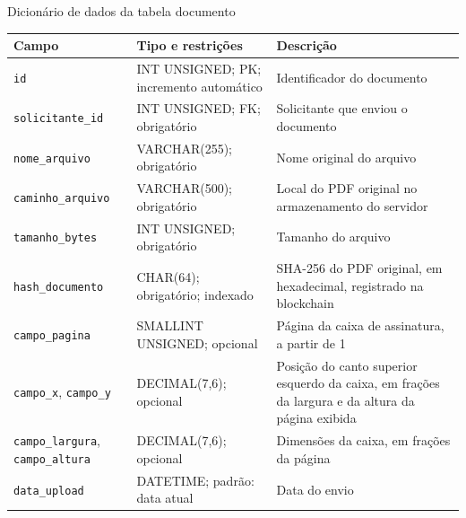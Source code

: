 \documentclass[
    12pt,
    a4paper,
    oneside,
    chapter=TITLE,
    section=TITLE,
    subsection=TITLE,
    subsubsection=TITLE,
    sumario=tradicional,
    english,
    brazil
]{abntex2}
\newcommand{\elem}[1]{\texttt{#1}}
\begin{document}
\begin{quadro}[H]
    \caption{Dicionário de dados da tabela documento}
    \label{quadro:dic-documento}
    \centering
    \footnotesize
    \begin{tabular}{L{4.5cm}L{3.6cm}L{6.3cm}}
        \toprule
        \textbf{Campo} & \textbf{Tipo e restrições} & \textbf{Descrição} \\
        \midrule
        \elem{id} & INT UNSIGNED; PK; incremento automático & Identificador do documento \\
        \elem{solicitante\_id} & INT UNSIGNED; FK; obrigatório & Solicitante que enviou o documento \\
        \elem{nome\_arquivo} & VARCHAR(255); obrigatório & Nome original do arquivo \\
        \elem{caminho\_arquivo} & VARCHAR(500); obrigatório & Local do PDF original no armazenamento do servidor \\
        \elem{tamanho\_bytes} & INT UNSIGNED; obrigatório & Tamanho do arquivo \\
        \elem{hash\_documento} & CHAR(64); obrigatório; indexado & SHA-256 do PDF original, em hexadecimal, registrado na blockchain \\
        \elem{campo\_pagina} & SMALLINT UNSIGNED; opcional & Página da caixa de assinatura, a partir de 1 \\
        \elem{campo\_x}, \elem{campo\_y} & DECIMAL(7,6); opcional & Posição do canto superior esquerdo da caixa, em frações da largura e da altura da página exibida \\
        \elem{campo\_largura}, \elem{campo\_altura} & DECIMAL(7,6); opcional & Dimensões da caixa, em frações da página \\
        \elem{data\_upload} & DATETIME; padrão: data atual & Data do envio \\
        \bottomrule
    \end{tabular}
\end{quadro}
\end{document}
